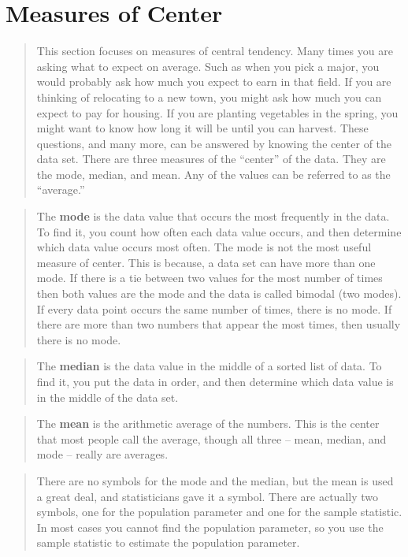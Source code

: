 \documentclass[]{book}
\begin{document}
\hypertarget{measures-of-center}{%
\section{Measures of Center}\label{measures-of-center}}

\begin{quote}
This section focuses on measures of central tendency. Many times you are asking what to expect on average. Such as when you pick a major, you would probably ask how much you expect to earn in that field. If you are thinking of relocating to a new town, you might ask how much you can expect to pay for housing. If you are planting vegetables in the spring, you might want to know how long it will be until you can harvest. These questions, and many more, can be answered by knowing the center of the data set. There are three measures of the ``center'' of the data. They are the mode, median, and mean. Any of the values can be referred to as the ``average.''
\end{quote}

\begin{quote}
The \textbf{mode} is the data value that occurs the most frequently in the data. To find it, you count how often each data value occurs, and then determine which data value occurs most often. The mode is not the most useful measure of center. This is because, a data set can have more than one mode. If there is a tie between two values for the most number of times then both values are the mode and the data is called bimodal (two modes). If every data point occurs the same number of times, there is no mode. If there are more than two numbers that appear the most times, then usually there is no mode.
\end{quote}

\begin{quote}
The \textbf{median} is the data value in the middle of a sorted list of data. To find it, you put the data in order, and then determine which data value is in the middle of the data set.
\end{quote}

\begin{quote}
The \textbf{mean} is the arithmetic average of the numbers. This is the center that most people call the average, though all three -- mean, median, and mode -- really are averages.
\end{quote}

\begin{quote}
There are no symbols for the mode and the median, but the mean is used a great deal, and statisticians gave it a symbol. There are actually two symbols, one for the population parameter and one for the sample statistic. In most cases you cannot find the population parameter, so you use the sample statistic to estimate the population parameter.
\end{quote}
\end{document}

